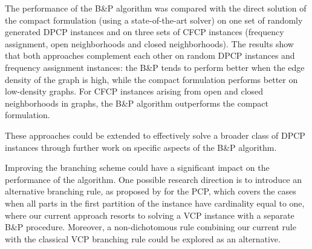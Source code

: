 \documentclass[preprint, 11pt, authoryear]{elsarticle}
\newcommand{\PP}{{\mathcal P}}
\newcommand{\card}[1]{\left| #1 \right|}
\begin{document}

The performance of the B\&P algorithm was compared with the direct solution of the compact formulation (using a state-of-the-art solver) on one set of randomly generated DPCP instances and on three sets of CFCP instances (frequency assignment, open neighborhoods and closed neighborhoods). The results show that both approaches complement each other on random DPCP instances and frequency assignment instances: the B\&P tends to perform better when the edge density of the graph is high, while the compact formulation performs better on low-density graphs. For CFCP instances arising from open and closed neighborhoods in graphs, 
the B\&P algorithm outperforms the compact formulation. 

These approaches could be extended to effectively solve a broader class of DPCP instances through further work on specific aspects of the B\&P algorithm.



Improving the branching scheme could have a significant impact on the performance of the algorithm. 
One possible research direction is to introduce an alternative branching rule, as proposed by \citet{Furini2018} for the PCP, which covers the cases 
when all parts in the first partition of the instance have cardinality equal to one, where our current approach resorts to solving a VCP instance with a separate B\&P procedure.
Moreover, a non-dichotomous rule combining our current rule with the classical VCP branching rule could be explored as an alternative.
 
\end{document}
